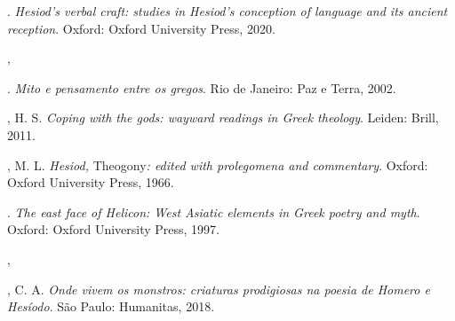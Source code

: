 \begin{bibliohedra}
\titidem. \textit{Hesiod's verbal craft: studies in Hesiod's conception of
language and its ancient reception}. Oxford: Oxford University Press,
2020.

, 

\titidem. \textit{Mito e pensamento entre os gregos}. Rio de Janeiro: Paz e
Terra, 2002.

, H. S. \textit{Coping with the gods: wayward readings in Greek
theology}. Leiden: Brill, 2011.

, M. L. \textit{Hesiod,} Theogony\textit{: edited with prolegomena and
commentary}. Oxford: Oxford University Press, 1966.

\titidem. \textit{The east face of Helicon: West Asiatic elements in Greek poetry
and myth}. Oxford: Oxford University Press, 1997.

, 

, C. A. \textit{Onde vivem os monstros: criaturas prodigiosas na
poesia de Homero e Hesíodo}. São Paulo: Humanitas, 2018.
\end{bibliohedra}


